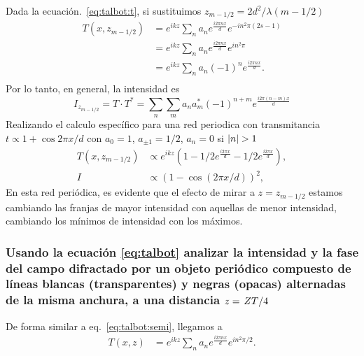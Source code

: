 \documentclass{./packages/optica-article}
\begin{document}
	      Dada la ecuación.~\ref{eq:talbot:t}, si sustituimos $z_{m-1/2} = 2d^2/\lambda (m - 1/2)$
	      \nopagebreak
	      \begin{align*}
		      T(x,z_{m - 1/2}) & =
		      e^{ikz}
		      \sum_{n} a_n e^{\frac{i 2 \pi n x} {d}} e^{- i n^2 \pi (2s - 1)} \\
		             & =
		      e^{ikz}
		      \sum_{n} a_n e^{\frac{i 2 \pi n x} {d}} e^{ i n^2 \pi}           \\
		             & =
		      e^{ikz}
		      \sum_{n} a_n (-1)^{n}e^{\frac{i 2 \pi n x} {d}}.                 \\
	      \end{align*}
	      Por lo tanto, en general, la intensidad es
	      \begin{equation}\label{eq:talbot:semi}
		      I_{z_{m - 1/2}} = T \cdot T^{*}  =
		      \sum_{n} \sum_{m} a_n a_{m}^{*} (-1)^{n + m}e^{\frac{i 2 \pi (n - m)  x} {d}}
	      \end{equation}
	      Realizando el calculo específico para una red periodica con transmitancia $t \propto 1 + \cos{2\pi x / d}$  con $a_0=1$, $a_{\pm 1}=1/2$, $a_n = 0$ si $\abs{n} > 1$
	      \nopagebreak
	      \begin{align*}
		      T(x,z_{m-1/2}) & \propto
		      e^{ikz}\left(
		      1-1/2
		      e^{\frac{i 2 \pi  x} {d}}-1/2
		      e^{\frac{i 2 \pi  x} {d}}
		      \right),                 \\
		      I              & \propto
		      \left(
		      1-\cos (2 \pi  x / d)
		      \right)^{2},
	      \end{align*}
	      En esta red periódica, es evidente que el efecto de mirar a $z=z_{m-1/2}$ estamos cambiando las franjas de mayor intensidad con aquellas de menor intensidad, cambiando los mínimos de intensidad con los máximos.
	      
\subsubsection{ Usando la ecuación \ref{eq:talbot} analizar la intensidad y la fase del campo difractado por un objeto periódico compuesto de líneas blancas (transparentes) y negras (opacas) alternadas de la misma anchura, a una distancia $z=\flatfrac{ZT}{4}$
}
	      De forma similar a eq.~\ref{eq:talbot:semi}, llegamos a
	      \begin{align}
		      T(x,z) & =
		      e^{ikz}
		      \sum_{n} a_n e^{\frac{i 2 \pi n x} {d}}e^{i n^{2} \pi / 2}.
	      \end{align}
\end{document}
